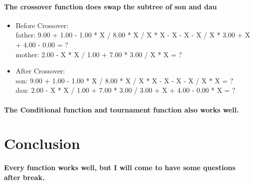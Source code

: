 \documentclass[12pt]{article}
\begin{document}
\paragraph{The crossover function does swap the subtree of son and dau}
\begin{itemize}
\item Before Crossover:\\father: 9.00 + 1.00 - 1.00 * X / 8.00 * X / X * X - X - X - X / X * 3.00 + X + 4.00 - 0.00 = ?\\
mother: 2.00 - X * X / 1.00 + 7.00 * 3.00 / X * X = ?
\item After Crossover: \\son: 9.00 + 1.00 - 1.00 * X / 8.00 * X / X * X - X - X - X / X * X = ?\\
dau: 2.00 - X * X / 1.00 + 7.00 * 3.00 / 3.00 + X + 4.00 - 0.00 * X = ?
\end{itemize}

\paragraph{The Conditional function and tournament function also works well. }

\section{Conclusion}
\paragraph{Every function works well, but I will come to have some questions after break.}
\end{document}
